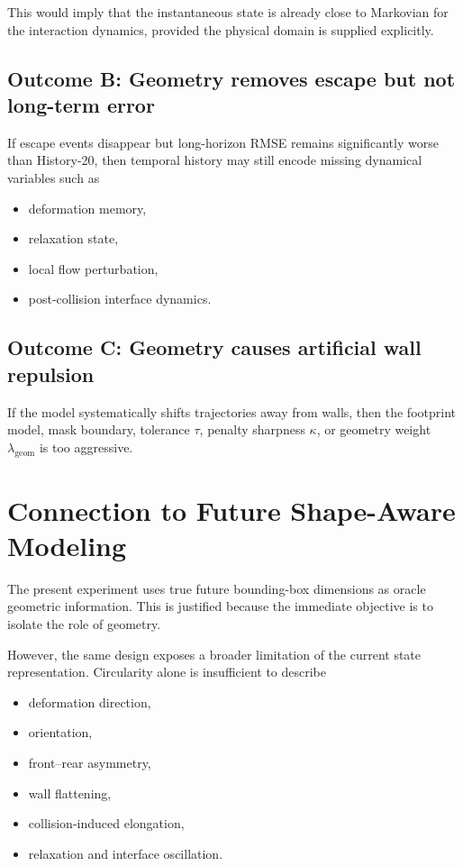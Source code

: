 \documentclass[11pt]{article}
\begin{document}
This would imply that the instantaneous state is already close to Markovian for the interaction dynamics, provided the physical domain is supplied explicitly.

\subsection{Outcome B: Geometry removes escape but not long-term error}

If escape events disappear but long-horizon RMSE remains significantly worse than History-20, then temporal history may still encode missing dynamical variables such as

\begin{itemize}[leftmargin=1.5em]
    \item deformation memory,
    \item relaxation state,
    \item local flow perturbation,
    \item post-collision interface dynamics.
\end{itemize}

\subsection{Outcome C: Geometry causes artificial wall repulsion}

If the model systematically shifts trajectories away from walls, then the footprint model, mask boundary, tolerance $\tau$, penalty sharpness $\kappa$, or geometry weight $\lambda_{\mathrm{geom}}$ is too aggressive.

\section{Connection to Future Shape-Aware Modeling}

The present experiment uses true future bounding-box dimensions as oracle geometric information. This is justified because the immediate objective is to isolate the role of geometry.

However, the same design exposes a broader limitation of the current state representation. Circularity alone is insufficient to describe

\begin{itemize}[leftmargin=1.5em]
    \item deformation direction,
    \item orientation,
    \item front--rear asymmetry,
    \item wall flattening,
    \item collision-induced elongation,
    \item relaxation and interface oscillation.
\end{itemize}
\end{document}
